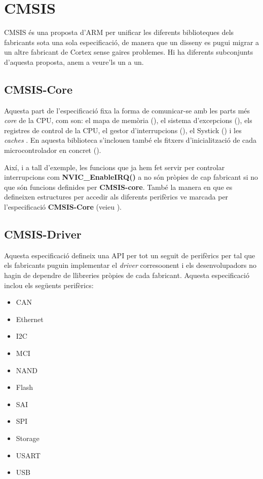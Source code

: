 \chapter{CMSIS}
\label{ch:CMSIS}
\gls{CMSIS} és una proposta d'ARM per unificar les diferents biblioteques dels fabricants sota una sola especificació, de manera que un disseny es pugui migrar a un altre fabricant de Cortex sense gaires problemes. Hi ha diferents subconjunts d'aquesta proposta, anem a veure'ls un a un.

\section{CMSIS-Core}
\label{sec:CMSIS-Core}
Aquesta part de l'especificació fixa la forma de comunicar-se amb les parts més {\em core} de la CPU, com son: el mapa de memòria (), el sistema d'excepcions (), els registres de control de la CPU, el gestor d'interrupcions (), el Systick () i les {\em caches} \cite{CMSIS-CORE}. En aquesta biblioteca s'inclouen també els fitxers d'inicialització de cada microcontrolador en concret ().

Així, i a tall d'exemple, les funcions que ja hem fet servir per controlar interrupcions com {\bf NVIC\_EnableIRQ()} a  no són pròpies de cap fabricant si no que són funcions definides per {\bf CMSIS-core}. També la manera en que es defineixen estructures per accedir als diferents perifèrics ve marcada per l'especificació {\bf CMSIS-Core} (veieu ).

\section{CMSIS-Driver}
Aquesta especificació defineix una \gls{API} per tot un seguit de perifèrics per tal que els fabricants puguin implementar el {\em driver} corresoonent i els desenvolupadors no hagin de dependre de llibreries pròpies de cada fabricant. Aquesta especificació inclou els següents perifèrics:
\begin{itemize}
 \item \gls{CAN}
 \item Ethernet
 \item I2C
 \item \gls{MCI}
 \item  NAND 
 \item Flash
 \item \gls{SAI}
 \item SPI
 \item Storage
 \item USART
 \item USB
\end{itemize}


